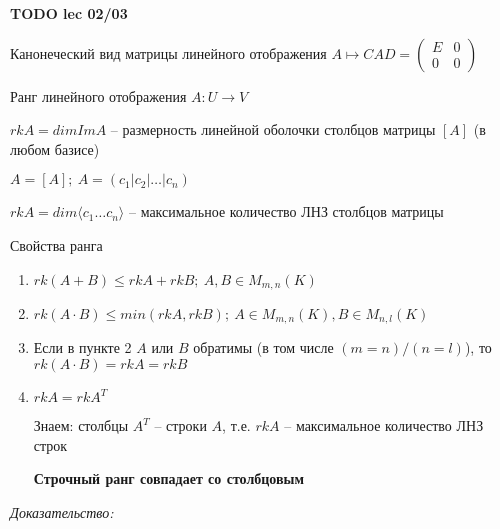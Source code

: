 \documentclass[12pt]{article}
\newcommand{\q}[1]{\langle #1 \rangle}
\begin{document}
\textbf{TODO lec 02/03}

\begin{defin}{Канонеческий вид матрицы линейного отображения}
    $A \mapsto CAD = \begin{pmatrix}
        E & 0 \\
        0 & 0
    \end{pmatrix}$
\end{defin}

\begin{defin}{Ранг линейного отображения}
    $A : U \rightarrow V$

    $rkA = dimImA$ -- размерность линейной оболочки столбцов матрицы $[A]$ (в любом базисе)

    $A = [A];\ A = (c_1 | c_2 | \ldots | c_n)$

    $rkA = dim\q{c_1 \ldots c_n}$ -- максимальное количество ЛНЗ столбцов матрицы
\end{defin}

\begin{theo}{Свойства ранга}
    \begin{enumerate}
        \item $rk(A + B) \leq rkA + rkB;\ A, B \in M_{m, n}(K)$
        \item $rk(A \cdot B) \leq min(rkA, rkB);\ A \in M_{m, n}(K), B \in M_{n, l}(K)$
        \item Если в пункте 2 $A$ или $B$ обратимы (в том числе $(m = n)/(n = l)$), то \\ $rk(A \cdot B) = rkA = rkB$
        \item $rkA = rkA^T$
        
        \begin{Remark}{}
            Знаем: столбцы $A^T$ -- строки $A$, т.е. $rkA$ -- максимальное количество ЛНЗ строк

            \textbf{Строчный ранг совпадает со столбцовым}
        \end{Remark}
    \end{enumerate}
\end{theo}

\textit{Доказательство:}
\end{document}
